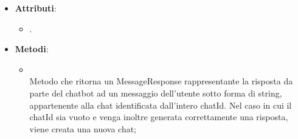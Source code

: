 \documentclass[10pt, a4paper]{article}
\begin{document}
\label{AskChatbotControllerDettaglio}
\begin{itemize}
    \item \textbf{Attributi}:
    \begin{itemize}
        \item {}.
    \end{itemize}
    \item \textbf{Metodi}:
    \begin{itemize}
        \item {}\\
        Metodo che ritorna un MessageResponse rappresentante la risposta da parte del chatbot ad un messaggio dell'utente sotto forma di string, appartenente alla chat identificata dall'intero chatId. Nel caso in cui il chatId sia vuoto e venga inoltre generata correttamente una risposta, viene creata una nuova chat;
        
    \end{itemize}
\end{itemize}
\end{document}
